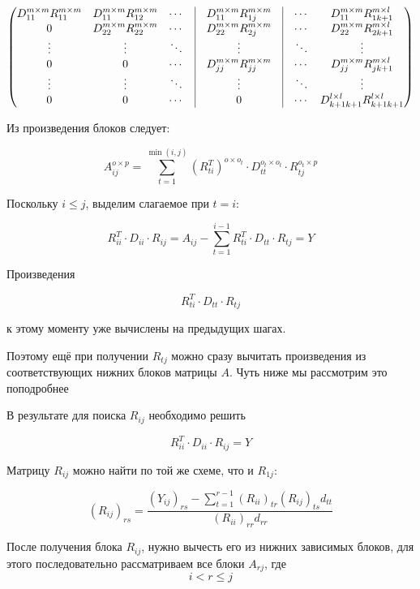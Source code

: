 \documentclass[a4paper,12pt]{article}
\begin{document}
$$\begin{aligned}
\begin{pmatrix}
    D_{11}^{m \times m} R_{11}^{m \times m} & D_{11}^{m \times m} R_{12}^{m \times m} & \cdots & \vline & D_{11}^{m \times m} R_{1j}^{m \times m} & \vline & \cdots & D_{11}^{m \times m} R_{1k+1}^{m \times l} \\
    0 & D_{22}^{m \times m} R_{22}^{m \times m} & \cdots & \vline & D_{22}^{m \times m} R_{2j}^{m \times m} & \vline & \cdots & D_{22}^{m \times m} R_{2k+1}^{m \times l} \\
    \vdots & \vdots & \ddots & \vline & \vdots & \vline & \ddots & \vdots \\
    0 & 0 & \cdots & \vline & D_{jj}^{m \times m} R_{jj}^{m \times m} & \vline & \cdots & D_{jj}^{m \times m} R_{jk+1}^{m \times l} \\
    \vdots & \vdots & \ddots & \vline & \vdots & \vline & \ddots & \vdots \\
    0 & 0 & \cdots & \vline & 0 & \vline & \cdots & D_{k+1k+1}^{l \times l} R_{k+1k+1}^{l \times l}
  \end{pmatrix}
\end{aligned}
$$

Из произведения блоков следует:

$$
A_{ij}^{o \times p}
=
\sum_{t=1}^{\operatorname{min}(i, j)}
(R_{ti}^T)^{o \times o_t}
\cdot
D_{tt}^{o_t \times o_t}
\cdot
R_{tj}^{o_t \times p}
$$

Поскольку $i \leq j$, выделим слагаемое при $t=i$:

$$
R_{ii}^T \cdot D_{ii} \cdot R_{ij}
=
A_{ij}
-
\sum_{t=1}^{i-1}
R_{ti}^T \cdot D_{tt} \cdot R_{tj}
=
Y
$$

Произведения

$$
R_{ti}^T \cdot D_{tt} \cdot R_{tj}
$$

к этому моменту уже вычислены на предыдущих шагах.

Поэтому ещё при получении $R_{tj}$ можно сразу вычитать произведения из соответствующих нижних блоков матрицы $A$. Чуть ниже мы рассмотрим это поподробнее


В результате для поиска $R_{ij}$ необходимо решить

$$
R_{ii}^T \cdot D_{ii} \cdot R_{ij} = Y
$$

Матрицу $R_{ij}$ можно найти по той же схеме, что и $R_{1j}$:

$$
(R_{ij})_{rs}
=
\frac{
  (Y_{ij})_{rs}
  -
  \sum_{t=1}^{r-1}
  (R_{ii})_{tr} (R_{ij})_{ts} d_{tt}
}{
  (R_{ii})_{rr} d_{rr}
}
$$

После получения блока $R_{ij}$, нужно вычесть его из нижних зависимых блоков, для этого последовательно рассматриваем все блоки
$A_{rj}$, где
$$
i < r \leq j
$$
\end{document}
